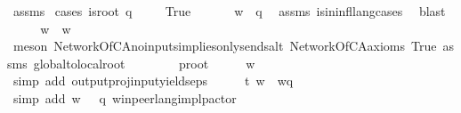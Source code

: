 \begin{isabellebody}
\isamarkupfalse%
\ assms\isanewline
{}\isamarkupfalse%
\ {\isacharparenleft}{\kern0pt}cases\ {\isachardoublequoteopen}is{\isacharunderscore}{\kern0pt}root\ q{\isachardoublequoteclose}{\isacharparenright}{\kern0pt}\ \isanewline
\ \ \isamarkupfalse%
\ True\ %
\isanewline
\ \ \isamarkupfalse%
\ \isamarkupfalse%
\ {\isachardoublequoteopen}w\ {\isasymin}\ {\isasymL}{\isacharparenleft}{\kern0pt}q{\isacharparenright}{\kern0pt}{\isachardoublequoteclose}\ \isamarkupfalse%
\ assms{\isacharparenleft}{\kern0pt}{}{\isacharparenright}{\kern0pt}\ is{\isacharunderscore}{\kern0pt}in{\isacharunderscore}{\kern0pt}infl{\isacharunderscore}{\kern0pt}lang{\isachardot}{\kern0pt}cases\ \isamarkupfalse%
\ blast\isanewline
\ \ \isamarkupfalse%
\ \isamarkupfalse%
\ {\isachardoublequoteopen}w\ {\isacharequal}{\kern0pt}\ w{\isasymdown}\isactrlsub {\isacharbang}{\kern0pt}{\isachardoublequoteclose}\ \ \isamarkupfalse%
\ {\isacharparenleft}{\kern0pt}meson\ NetworkOfCA{\isachardot}{\kern0pt}no{\isacharunderscore}{\kern0pt}inputs{\isacharunderscore}{\kern0pt}implies{\isacharunderscore}{\kern0pt}only{\isacharunderscore}{\kern0pt}sends{\isacharunderscore}{\kern0pt}alt\ NetworkOfCA{\isacharunderscore}{\kern0pt}axioms\ True\ assms{\isacharparenleft}{\kern0pt}{}{\isacharparenright}{\kern0pt}\ global{\isacharunderscore}{\kern0pt}to{\isacharunderscore}{\kern0pt}local{\isacharunderscore}{\kern0pt}root\isanewline
\ \ \ \ \ \ \ \ p{\isacharunderscore}{\kern0pt}root{\isacharparenright}{\kern0pt}\isanewline
\ \ \isamarkupfalse%
\ \isamarkupfalse%
\ {\isachardoublequoteopen}w{\isasymdown}\isactrlsub {\isacharquery}{\kern0pt}\ {\isacharequal}{\kern0pt}\ {\isasymepsilon}{\isachardoublequoteclose}\ \ \isamarkupfalse%
\ {\isacharparenleft}{\kern0pt}simp\ add{\isacharcolon}{\kern0pt}\ output{\isacharunderscore}{\kern0pt}proj{\isacharunderscore}{\kern0pt}input{\isacharunderscore}{\kern0pt}yields{\isacharunderscore}{\kern0pt}eps{\isacharparenright}{\kern0pt}\isanewline
\ \ \isamarkupfalse%
\ \isamarkupfalse%
\ t{}{\isacharcolon}{\kern0pt}\ {\isachardoublequoteopen}w\ {\isacharequal}{\kern0pt}\ w{\isasymdown}\isactrlsub q{\isachardoublequoteclose}\ \isamarkupfalse%
\ {\isacharparenleft}{\kern0pt}simp\ add{\isacharcolon}{\kern0pt}\ {\isacartoucheopen}w\ {\isasymin}\ {\isasymL}\ q{\isacartoucheclose}\ w{\isacharunderscore}{\kern0pt}in{\isacharunderscore}{\kern0pt}peer{\isacharunderscore}{\kern0pt}lang{\isacharunderscore}{\kern0pt}impl{\isacharunderscore}{\kern0pt}p{\isacharunderscore}{\kern0pt}actor{\isacharparenright}{\kern0pt}\isanewline

\end{isabellebody}
